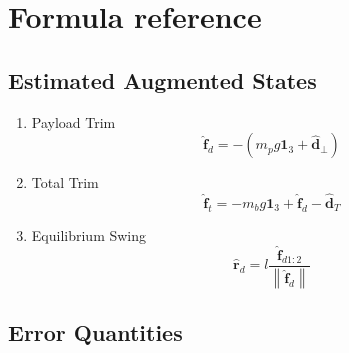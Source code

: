 \documentclass[12pt]{article}
\begin{document}
\section{Formula reference}

\subsection{Estimated Augmented States}
\begin{enumerate}
    \item Payload Trim
          \begin{equation}
              \hat{\mathbf{f}}_d = -\left(m_pg\mathbf{1}_3 + \hat{\mathbf{d}}_\perp\right)
          \end{equation}

    \item Total Trim
          \begin{equation}
              \hat{\mathbf{f}}_t = -m_bg\mathbf{1}_3 + \hat{\mathbf{f}}_d - \hat{\mathbf{d}}_T
          \end{equation}

    \item Equilibrium Swing
          \begin{equation}
              \hat{\mathbf{r}}_d = l\frac{\hat{\mathbf{f}}_{d1:2}}{\left\lVert\hat{\mathbf{f}}_d\right\rVert}
          \end{equation}
\end{enumerate}

\subsection{Error Quantities}
\end{document}
